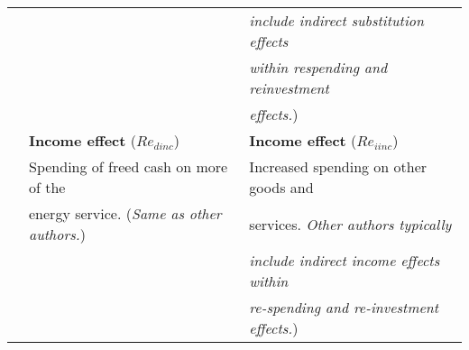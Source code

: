 \begin{table}
\begin{center}
\begin{tabular}{ r l l }
                                   &                                             & \emph{include indirect substitution effects} \\
                                   &                                             & \emph{within respending and reinvestment} \\ 
                                   &                                             & \emph{effects.}) \\ 
                                   \cmidrule{2-3}
                                   & \textbf{Income effect} ($Re_{dinc}$)        & \textbf{Income effect} ($Re_{iinc}$) \\
                                   & Spending of freed cash on more of the       & Increased spending on other goods and \\
                                   & energy service. (\emph{Same as other authors.}) & services. \emph{Other authors typically} \\
                                   &                                             & \emph{include indirect income effects within} \\ 
                                   &                                             & \emph{re-spending and re-investment effects.}) \\
\bottomrule
\end{tabular}
\end{center}
\end{table}




